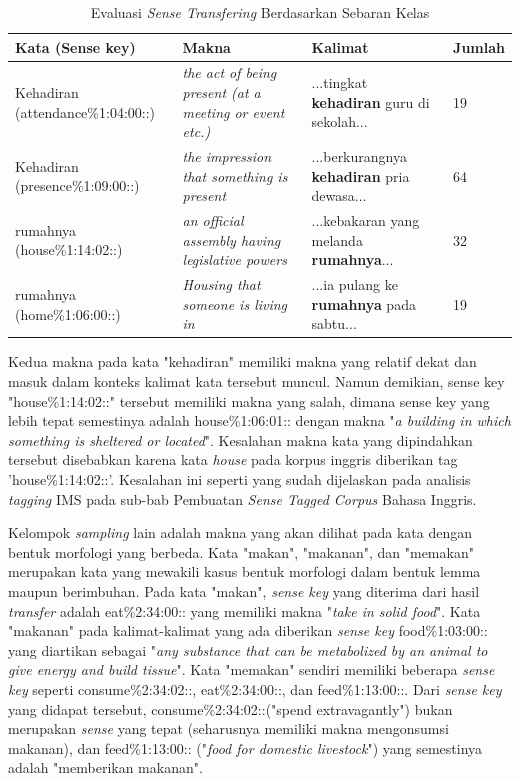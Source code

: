 \begin{table}
	\centering
	\caption{Evaluasi \textit{Sense Transfering} Berdasarkan Sebaran Kelas}
	\label{table:class-instance-sense-transfering-evaluation}
	\begin{tabular}{|p{4cm}|p{2.85cm}|p{2.85cm}|p{1.2cm}|}
		\hline
		Kata (Sense key) & Makna & Kalimat & Jumlah
		\\ \hline
		Kehadiran (attendance\%1:04:00::)  & 
		\textit{the act of being present (at a meeting or event etc.)}   & 
		...tingkat \textbf{kehadiran} guru di sekolah... &
		19
		\\ \hline
		Kehadiran (presence\%1:09:00::) & 
		\textit{the impression that something is present}   & 
		...berkurangnya \textbf{kehadiran} pria dewasa...
		&
		64
		\\ \hline
		rumahnya (house\%1:14:02::) & 
		\textit{an official assembly having legislative powers} & 
		...kebakaran yang melanda \textbf{rumahnya}...
		& 32
		\\ \hline
		rumahnya (home\%1:06:00::) &
		\textit{Housing that someone is living in} &
		...ia pulang ke \textbf{rumahnya} pada sabtu...
		& 19
		\\ \hline
	\end{tabular}
\end{table}

Kedua makna pada kata "kehadiran" memiliki makna yang relatif dekat dan masuk dalam konteks kalimat kata tersebut muncul. Namun demikian, sense key "house\%1:14:02::" tersebut memiliki makna yang salah, dimana sense key yang lebih tepat semestinya adalah house\%1:06:01:: dengan makna "\textit{a building in which something is sheltered or located}". Kesalahan makna kata yang dipindahkan tersebut disebabkan karena kata \textit{house} pada korpus inggris diberikan tag 'house\%1:14:02::'. Kesalahan ini seperti yang sudah dijelaskan pada analisis \textit{tagging} IMS pada sub-bab Pembuatan \textit{Sense Tagged Corpus} Bahasa Inggris.


Kelompok \textit{sampling} lain adalah makna yang akan dilihat pada kata dengan bentuk morfologi yang berbeda. Kata "makan", "makanan", dan "memakan" merupakan kata yang mewakili kasus bentuk morfologi dalam bentuk lemma maupun berimbuhan. Pada kata "makan", \textit{sense key} yang diterima dari hasil \textit{transfer} adalah eat\%2:34:00:: yang memiliki makna "\textit{take in solid food}". Kata "makanan" pada kalimat-kalimat yang ada diberikan \textit{sense key} food\%1:03:00:: yang diartikan sebagai "\textit{any substance that can be metabolized by an animal to give energy and build tissue}". Kata "memakan" sendiri memiliki beberapa \textit{sense key} seperti consume\%2:34:02::, eat\%2:34:00::, dan feed\%1:13:00::. Dari \textit{sense key} yang didapat tersebut, consume\%2:34:02::("spend extravagantly") bukan merupakan \textit{sense} yang tepat (seharusnya memiliki makna mengonsumsi makanan), dan feed\%1:13:00:: ("\textit{food for domestic livestock}") yang semestinya adalah "memberikan makanan".

